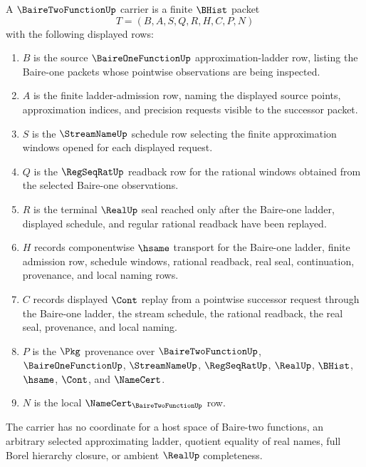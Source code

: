 \begin{definition}
\label{def:baire-two-function-carrier}
A $\BaireTwoFunctionUp$ carrier is a finite $\BHist$ packet
$$
T=(B,A,S,Q,R,H,C,P,N)
$$
with the following displayed rows:
\begin{enumerate}
\item $B$ is the source $\BaireOneFunctionUp$ approximation-ladder row, listing the Baire-one packets whose pointwise observations are being inspected.
\item $A$ is the finite ladder-admission row, naming the displayed source points, approximation indices, and precision requests visible to the successor packet.
\item $S$ is the $\StreamNameUp$ schedule row selecting the finite approximation windows opened for each displayed request.
\item $Q$ is the $\RegSeqRatUp$ readback row for the rational windows obtained from the selected Baire-one observations.
\item $R$ is the terminal $\RealUp$ seal reached only after the Baire-one ladder, displayed schedule, and regular rational readback have been replayed.
\item $H$ records componentwise $\hsame$ transport for the Baire-one ladder, finite admission row, schedule windows, rational readback, real seal, continuation, provenance, and local naming rows.
\item $C$ records displayed $\Cont$ replay from a pointwise successor request through the Baire-one ladder, the stream schedule, the rational readback, the real seal, provenance, and local naming.
\item $P$ is the $\Pkg$ provenance over $\BaireTwoFunctionUp$, $\BaireOneFunctionUp$, $\StreamNameUp$, $\RegSeqRatUp$, $\RealUp$, $\BHist$, $\hsame$, $\Cont$, and $\NameCert$.
\item $N$ is the local $\NameCert_{\BaireTwoFunctionUp}$ row.
\end{enumerate}
The carrier has no coordinate for a host space of Baire-two functions, an arbitrary selected approximating ladder, quotient equality of real names, full Borel hierarchy closure, or ambient $\RealUp$ completeness.
\end{definition}

